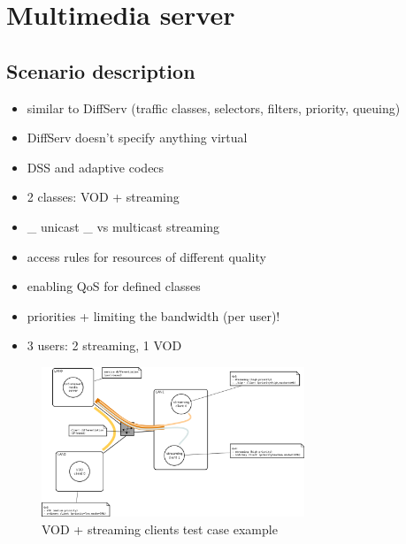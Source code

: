 \documentclass[11pt]{book}
\begin{document}
    \section{Multimedia server}

      \subsection{Scenario description}

        \begin{itemize}
          \item similar to DiffServ (traffic classes, selectors, filters, priority, queuing)
          \item DiffServ doesn't specify anything virtual
          \item DSS and adaptive codecs
        \end{itemize}

        \begin{itemize}
          \item 2 classes: VOD + streaming
          \item \_ unicast \_ vs multicast streaming
          \item access rules for resources of different quality
          \item enabling QoS for defined classes
          \item priorities + limiting the bandwidth (per user)!
          \item 3 users: 2 streaming, 1 VOD
        \end{itemize}

        \begin{figure}[H]
                   \begin{center}
                         \includegraphics[width=0.7\textwidth]{img/test-case/diagram.png}
                         \caption{VOD + streaming clients test case example}
                   \end{center}
        \end{figure}
\end{document}
